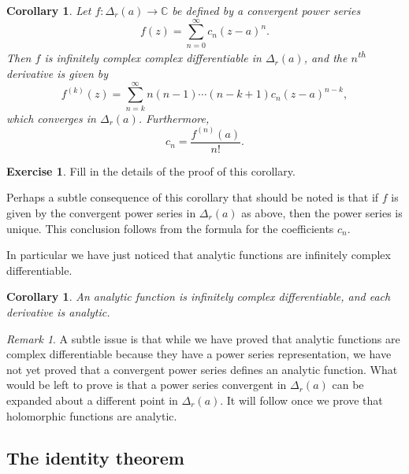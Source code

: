 \documentclass[12pt,openany]{book}
\newcommand{\C}{{\mathbb{C}}}
\theoremstyle{plain}
\newtheorem{cor}[thm]{Corollary}
\theoremstyle{remark}
\newtheorem{remark}[thm]{Remark}
\theoremstyle{definition}
\newenvironment{exbox}{%
    \def\FrameCommand{\vrule width 1pt \relax\hspace {10pt}}%
    \MakeFramed {\advance \hsize -\width \FrameRestore }%
}{%
    \endMakeFramed
}
\theoremstyle{exercise}
\newtheorem{exercise}{Exercise}[section]
\theoremstyle{example}
\begin{document}
\begin{cor} \label{cor:convpowserinfdif}
Let $f \colon \Delta_r(a) \to \C$ be defined by a convergent power series
\begin{equation*}
f(z) = \sum_{n=0}^\infty c_n {(z-a)}^n .
\end{equation*}
Then $f$ is infinitely complex complex differentiable in $\Delta_r(a)$,
and the $n$\textsuperscript{th} derivative is given by
\begin{equation*}
f^{(k)}(z) = \sum_{n=k}^\infty n(n-1)\cdots(n-k+1) c_n {(z-a)}^{n-k} ,
\end{equation*}
which converges in $\Delta_r(a)$.
Furthermore,
\begin{equation*}
c_n =
\frac{f^{(n)}(a)}{n!} .
\end{equation*}
\end{cor}

\begin{exbox}
\begin{exercise}
Fill in the details of the proof of this corollary.
\end{exercise}
\end{exbox}

Perhaps a subtle consequence of
this corollary that should be
noted is that if $f$ is given by the convergent power series in
$\Delta_r(a)$ as above, then the power series is unique.  This conclusion
follows from the formula for the coefficients $c_n$.

In particular we have just noticed that
analytic functions are infinitely complex differentiable.

\begin{cor} \label{cor:analinfdif}
An analytic function is infinitely complex differentiable, and each
derivative is analytic.
\end{cor}

\begin{remark}
A subtle issue is that while we have proved that analytic functions are
complex differentiable because they have a power series representation,
we have not yet proved that a convergent power series defines an analytic
function.  What would be left to prove is that a power series convergent
in $\Delta_r(a)$ can be
expanded about a different point in $\Delta_r(a)$.  It will follow
once we prove that holomorphic functions are analytic.
\end{remark}

\subsection{The identity theorem}
\end{document}

